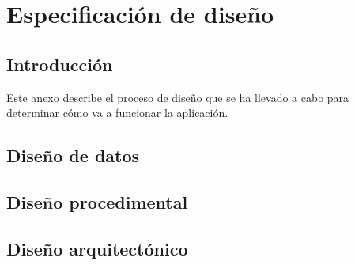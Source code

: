 \chapter{Especificación de diseño}
\label{cha:Especificación de diseño}

\section{Introducción}

Este anexo describe el proceso de diseño que se ha llevado a cabo para
determinar cómo va a funcionar la aplicación.

\section{Diseño de datos}

\section{Diseño procedimental}

\section{Diseño arquitectónico}


